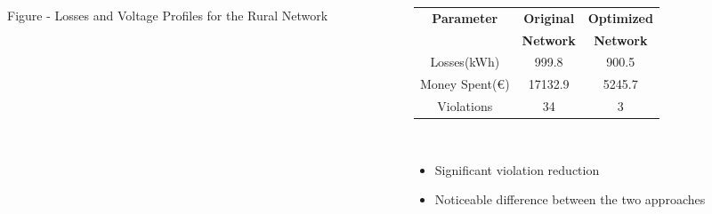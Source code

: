 \documentclass[final]{beamer}
\begin{document}
\begin{frame}[t]
\begin{columns}
\begin{column}{0.8\linewidth}
\begin{figure}[!h]
\begin{minipage}[H]{.33\columnwidth}
    \setlength\figureheight{4.5cm}
    \setlength\figurewidth{5.5cm}
	
\end{minipage}%
\begin{minipage}[H]{.33\columnwidth}
	\vspace*{-0.3cm}
	\setlength\figureheight{4.5cm}
    \setlength\figurewidth{5.5cm}
	
\end{minipage}%
\begin{minipage}[H]{.33\columnwidth}
	\vspace*{-0.3cm}
	\setlength\figureheight{4.5cm}
    \setlength\figurewidth{5.5cm}
	
\end{minipage}%
\caption*{Figure - Losses and Voltage Profiles for the Rural Network}
\label{fig:mandb}
\end{figure}
\end{column}
\begin{column}{0.25\linewidth}
 \vspace*{-2.5cm}
\justifying
 \begin{table}[!hl]
\begin{tabular}{ccc}
\textbf{Parameter} & \textbf{Original} & \textbf{Optimized}\\
& \textbf{Network} & \textbf{Network}\\
\hline
Losses(kWh) & 999.8 & 900.5\\
Money Spent(\euro) & 17132.9 & 5245.7 \\
Violations & 34 & 3\\
\hline
\end{tabular}
\end{table}
\ \\
\begin{itemize}
\item Significant violation reduction
\item Noticeable difference between the two approaches
\end{itemize}
\end{column}
\end{columns}

\noindent\makebox[\linewidth]{\rule{0.95\paperwidth}{0.4pt}}


\end{frame}
\end{document}
